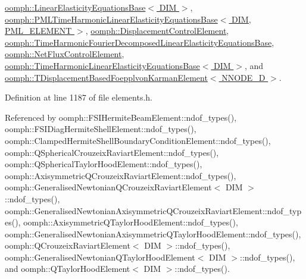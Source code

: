 \hyperlink{classoomph_1_1LinearElasticityEquationsBase_add3ab9f1bbd914e5a460bfefb4eff5c9}{oomph\+::\+Linear\+Elasticity\+Equations\+Base$<$ D\+I\+M $>$}, \hyperlink{classoomph_1_1PMLTimeHarmonicLinearElasticityEquationsBase_a99ebd7d2a04356e12bf02630e89c8836}{oomph\+::\+P\+M\+L\+Time\+Harmonic\+Linear\+Elasticity\+Equations\+Base$<$ D\+I\+M, P\+M\+L\+\_\+\+E\+L\+E\+M\+E\+N\+T $>$}, \hyperlink{classoomph_1_1DisplacementControlElement_a4b076c21ac84aefbb52f4bf0c7a40cc8}{oomph\+::\+Displacement\+Control\+Element}, \hyperlink{classoomph_1_1TimeHarmonicFourierDecomposedLinearElasticityEquationsBase_ae49e9b233a22735986bf1bc3ef31502f}{oomph\+::\+Time\+Harmonic\+Fourier\+Decomposed\+Linear\+Elasticity\+Equations\+Base}, \hyperlink{classoomph_1_1NetFluxControlElement_ac4eedd635a016d29fd9e6da5ae0f8707}{oomph\+::\+Net\+Flux\+Control\+Element}, \hyperlink{classoomph_1_1TimeHarmonicLinearElasticityEquationsBase_ac74f1b42228e68d61ebe3d20cc8ba001}{oomph\+::\+Time\+Harmonic\+Linear\+Elasticity\+Equations\+Base$<$ D\+I\+M $>$}, and \hyperlink{classoomph_1_1TDisplacementBasedFoepplvonKarmanElement_ad029c2562317f83814272ad57d8f7582}{oomph\+::\+T\+Displacement\+Based\+Foepplvon\+Karman\+Element$<$ N\+N\+O\+D\+E\+\_\+D $>$}.



Definition at line 1187 of file elements.\+h.



Referenced by oomph\+::\+F\+S\+I\+Hermite\+Beam\+Element\+::ndof\+\_\+types(), oomph\+::\+F\+S\+I\+Diag\+Hermite\+Shell\+Element\+::ndof\+\_\+types(), oomph\+::\+Clamped\+Hermite\+Shell\+Boundary\+Condition\+Element\+::ndof\+\_\+types(), oomph\+::\+Q\+Spherical\+Crouzeix\+Raviart\+Element\+::ndof\+\_\+types(), oomph\+::\+Q\+Spherical\+Taylor\+Hood\+Element\+::ndof\+\_\+types(), oomph\+::\+Axisymmetric\+Q\+Crouzeix\+Raviart\+Element\+::ndof\+\_\+types(), oomph\+::\+Generalised\+Newtonian\+Q\+Crouzeix\+Raviart\+Element$<$ D\+I\+M $>$\+::ndof\+\_\+types(), oomph\+::\+Generalised\+Newtonian\+Axisymmetric\+Q\+Crouzeix\+Raviart\+Element\+::ndof\+\_\+types(), oomph\+::\+Axisymmetric\+Q\+Taylor\+Hood\+Element\+::ndof\+\_\+types(), oomph\+::\+Generalised\+Newtonian\+Axisymmetric\+Q\+Taylor\+Hood\+Element\+::ndof\+\_\+types(), oomph\+::\+Q\+Crouzeix\+Raviart\+Element$<$ D\+I\+M $>$\+::ndof\+\_\+types(), oomph\+::\+Generalised\+Newtonian\+Q\+Taylor\+Hood\+Element$<$ D\+I\+M $>$\+::ndof\+\_\+types(), and oomph\+::\+Q\+Taylor\+Hood\+Element$<$ D\+I\+M $>$\+::ndof\+\_\+types().

\mbox{\label{classoomph_1_1GeneralisedElement_a63bf8f3db94fdb4098ff61fa930a6d40}} 
